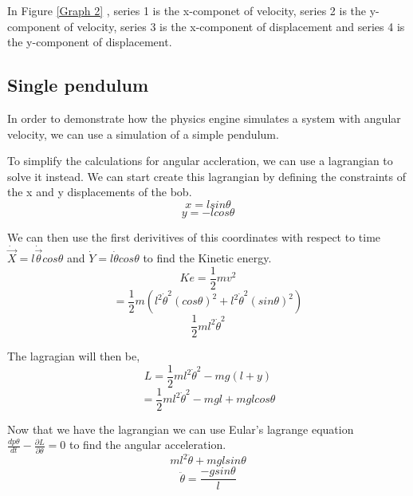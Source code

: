 \documentclass[12pt, a2paper]{article}
\begin{document}
In Figure \ref{Graph 2} , series 1 is the x-componet of velocity, series 2 is the y-component of velocity, series 3 is the x-component of displacement and series 4 is the y-component of displacement.
\pagebreak

\subsection{Single pendulum}
In order to demonstrate how the physics engine simulates a system with angular velocity, we can use a simulation of a simple pendulum. 

To simplify the calculations for angular accleration, we can use a lagrangian to solve it instead. We can start create this lagrangian by defining the constraints of the x and y displacements of the bob.
\[x = lsin\theta\]
\[y = -lcos\theta\]

We can then use the first derivitives of this coordinates with respect to time \(\dot{\vec{X}} = l\dot{\vec{\theta}}cos\theta\) and \(\dot{Y} = l\dot{\theta}cos\theta\) to find the Kinetic energy.
\[Ke = \frac{1}{2}mv^2\]
\[= \frac{1}{2}m(l^2\dot{\theta}^2(cos\theta)^2+l^2\dot{\theta}^2(sin\theta)^2)\]
\[\frac{1}{2}ml^2\dot{\theta}^2\]

The lagragian will then be,
\[L = \frac{1}{2}ml^2\dot{\theta}^2-mg(l+y)\]
\[= \frac{1}{2}ml^2\dot{\theta}^2-mgl+mglcos\theta\]

Now that we have the lagrangian we can use Eular's lagrange equation \(\frac{dp\theta}{dt}-\frac{\partial L}{\partial\theta} = 0\) to find the angular acceleration.
\[ml^2\ddot{\theta}+mglsin\theta\]
\[\ddot{\theta} = \frac{-gsin\theta}{l}\]
\end{document}
